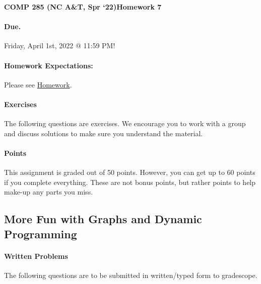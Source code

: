 \documentclass [12pt]{article}
\begin{document}
 

{\LARGE \textbf {COMP 285 (NC A\&T, Spr `22)}\hfill \textbf {Homework 7} } 
\vspace {1em} 
\begin{Instruction} 

\paragraph {Due.} Friday, April 1st, 2022 @ 11:59 PM!
\end{Instruction} 

\vspace {1em} 
\begin{Instruction} \paragraph {Homework Expectations:} Please see \href{https://www.comp285-fall22.ml/homework/#general-homework-information}{Homework}.
\end{Instruction}

\vspace {1em} 
\begin{Instruction} 

\paragraph {Exercises} The following questions are exercises. We encourage you to work with a group and discuss solutions to make sure you understand the material.

\paragraph {Points} This assignment is graded out of 50 points. However, you can get up to 60 points if you complete everything. These are not bonus points, but rather points to help make-up any parts you miss.

\end{Instruction} 

\begin{centering}
\section*{More Fun with Graphs and Dynamic Programming}
\end{centering}

\begin{Instruction}

\paragraph{Written Problems} The following questions are to be submitted in written/typed form to gradescope.

\end{Instruction}
\end{document}
